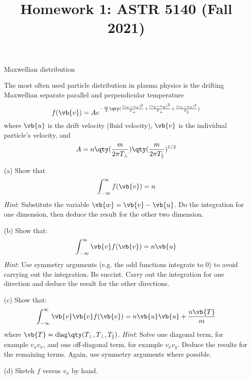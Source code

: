 \documentclass[12pt]{article}
\title{Homework 1: ASTR 5140 (Fall 2021)}
\begin{document}
\maketitle


\begin{problem}[Problem 1.]{Maxwellian distribution}

The most often used particle distribution in plasma physics is the drifting
Maxwellian separate parallel and perpendicular temperature
\begin{equation}
    f(\vb{v})=Ae^{-\frac{m}{2}\qty(
        \frac{(v_x-u_x)^2}{T_\perp}+
        \frac{(v_y-u_y)^2}{T_\perp}+
        \frac{(v_z-u_z)^2}{T_\|}
    )}
\end{equation}
where $\vb{u}$ is the drift velocity (fluid velocity), $\vb{v}$ is the
individual particle's velocity, and
\begin{equation}
    A=n\qty(\frac{m}{2\pi T_\perp})\qty(\frac{m}{2\pi T_\|})^{1/2} 
\end{equation}

(a) Show that
\begin{equation}
    \int_{-\infty}^\infty f(\vb{v})=n  
\end{equation}
\textit{Hint}: Substitute the variable $\vb{w}=\vb{v}-\vb{u}$. Do the 
integration for one dimension, then deduce the result for the other two 
dimension.

(b) Show that:
\begin{equation}
    \int_{-\infty}^\infty\vb{v}f(\vb{v})=n\vb{u} 
\end{equation}
\textit{Hint}: Use symmetry arguments (e.g. the odd functions integrate to 0) to
avoid carrying out the integration. Be succint. Carry out the integration for
one direction and deduce the result for the other directions.

(c) Show that:
\begin{equation}
    \int_{-\infty}^\infty \vb{v}\vb{v}f(\vb{v})=n\vb{u}\vb{u}+\frac{n\vb{T}}{m} 
\end{equation}
where $\vb{T}=\text{diag}\qty(T_\perp,T_\perp,T_\|)$. \textit{Hint}: Solve one
diagonal term, for example $v_xv_x$, and one off-diagonal term, for example
$v_xv_y$. Deduce the results for the remaining terms. Again, use symmetry
arguments where possible.

(d) Sketch $f$ versus $v_x$ by hand.
\end{problem}
\end{document}

